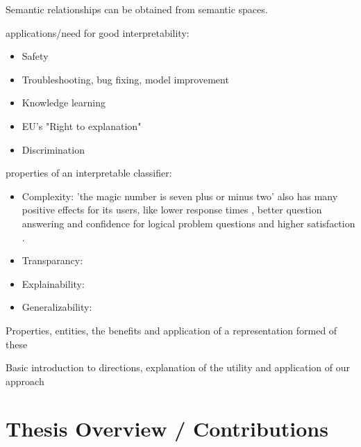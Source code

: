 Semantic relationships can be obtained from semantic spaces. 

applications/need for good interpretability:
\begin{itemize}
	\item Safety
	\item Troubleshooting, bug fixing, model improvement
	\item Knowledge learning
	\item EU's "Right to explanation"
	\item Discrimination
\end{itemize}

properties of an interpretable classifier:
\begin{itemize}
	\item Complexity: 'the magic number is seven plus or minus two' \cite{Saaty2003} also has many positive effects for its users, like lower response times \cite{Narayanan2018, Huysmans2011}, better question answering and confidence for logical problem questions \cite{Huysmans2011} and higher satisfaction \cite{Narayanan2018}.
	\item Transparancy: 
	\item Explainability: 
	\item Generalizability:
\end{itemize}



Properties, entities, the benefits and application of a representation formed of these

Basic introduction to directions, explanation of the utility and application of our approach
\section{Thesis Overview / Contributions}


